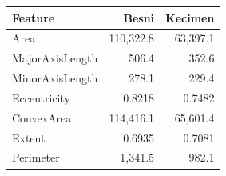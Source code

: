\begin{tabular}{lrr}
\toprule
Feature & Besni & Kecimen \\
\midrule
Area & 110,322.8 & 63,397.1 \\
MajorAxisLength & 506.4 & 352.6 \\
MinorAxisLength & 278.1 & 229.4 \\
Eccentricity & 0.8218 & 0.7482 \\
ConvexArea & 114,416.1 & 65,601.4 \\
Extent & 0.6935 & 0.7081 \\
Perimeter & 1,341.5 & 982.1 \\
\bottomrule
\end{tabular}
